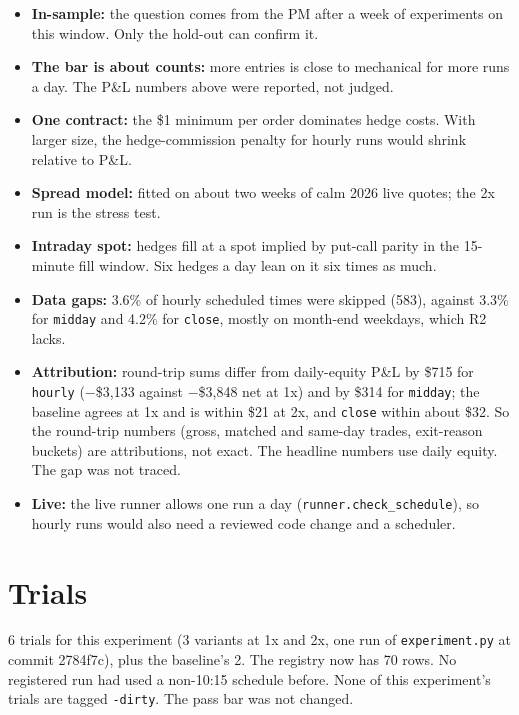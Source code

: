 \documentclass{article}
\begin{document}
\begin{itemize}

\item \textbf{In-sample:} the question comes from the PM after a week of experiments on this window. Only the hold-out can confirm it.

\item \textbf{The bar is about counts:} more entries is close to mechanical for more runs a day. The P\&L numbers above were reported, not judged.

\item \textbf{One contract:} the \$1 minimum per order dominates hedge costs. With larger size, the hedge-commission penalty for hourly runs would shrink relative to P\&L.

\item \textbf{Spread model:} fitted on about two weeks of calm 2026 live quotes; the 2x run is the stress test.

\item \textbf{Intraday spot:} hedges fill at a spot implied by put-call parity in the 15-minute fill window. Six hedges a day lean on it six times as much.

\item \textbf{Data gaps:} 3.6\% of hourly scheduled times were skipped (583), against 3.3\% for \texttt{midday} and 4.2\% for \texttt{close}, mostly on month-end weekdays, which R2 lacks.

\item \textbf{Attribution:} round-trip sums differ from daily-equity P\&L by \$715 for \texttt{hourly} (\ensuremath{-}\$3,133 against \ensuremath{-}\$3,848 net at 1x) and by \$314 for \texttt{midday}; the baseline agrees at 1x and is within \$21 at 2x, and \texttt{close} within about \$32. So the round-trip numbers (gross, matched and same-day trades, exit-reason buckets) are attributions, not exact. The headline numbers use daily equity. The gap was not traced.

\item \textbf{Live:} the live runner allows one run a day (\texttt{runner.\allowbreak{}check\_\allowbreak{}schedule}), so hourly runs would also need a reviewed code change and a scheduler.

\end{itemize}

\section{Trials}

6 trials for this experiment (3 variants at 1x and 2x, one run of \texttt{experiment.\allowbreak{}py} at commit 2784f7c), plus the baseline's 2. The registry now has 70 rows. No registered run had used a non-10:15 schedule before. None of this experiment's trials are tagged \texttt{-\allowbreak{}dirty}. The pass bar was not changed.
\end{document}
